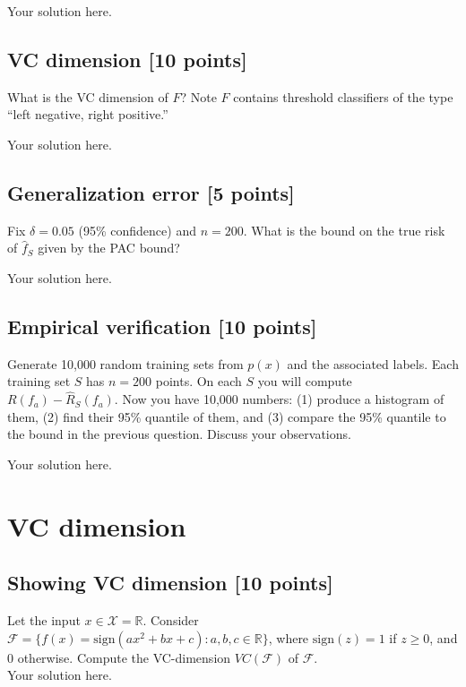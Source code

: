 \documentclass[a4paper]{article}
\theoremstyle{definition}
\newcommand{\R}{\mathbb R}
\newcommand{\sgn}{\mathrm{sign}}
\begin{document}
{\color{blue}
	Your solution here.
}

\subsection{VC dimension [10 points]}

What is the VC dimension of $F$?  Note $F$ contains threshold classifiers of the type ``left negative, right positive.''

{\color{blue}
	Your solution here.
}

\subsection{Generalization error [5 points]}

Fix $\delta=0.05$ (95\% confidence) and $n=200$.  What is the bound on the true risk of $\hat f_S$ given by the PAC bound?

{\color{blue}
	Your solution here.
}


\subsection{Empirical verification [10 points]}

Generate 10,000 random training sets from $p(x)$ and the associated labels.  Each training set $S$ has $n=200$ points.
On each $S$ you will compute $R(f_a) - \hat R_S(f_a)$.
Now you have 10,000 numbers: (1) produce a histogram of them, (2) find their 95\% quantile of them, and (3) compare the 95\% quantile to the bound in the previous question.  
Discuss your observations.

{\color{blue}
	Your solution here.
}

\section{VC dimension}

\subsection{Showing VC dimension [10 points]}
Let the input $x\in \mathcal{X}=\R$.
Consider $\mathcal{F}=\{f(x)=\sgn(ax^2+bx+c): a, b, c \in \R\}$, where $\sgn(z)=1$ if $z\ge0$, and 0 otherwise.
Compute the VC-dimension $VC(\mathcal{F})$ of $\mathcal F$.\\
{\color{blue}
	Your solution here.
}
\end{document}
